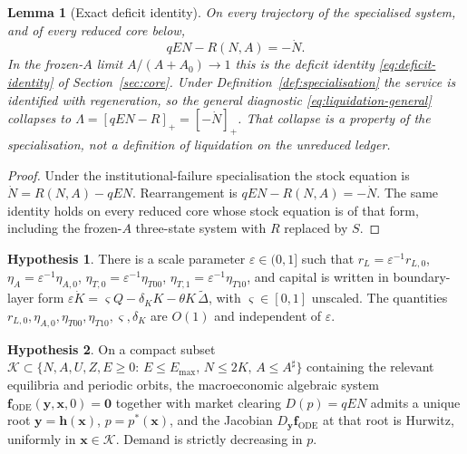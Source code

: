 \documentclass[11pt]{article}
\newtheorem{lemma}{Lemma}
\theoremstyle{definition}
\newtheorem{hypothesis}{Hypothesis}
\begin{document}
\begin{lemma}[Exact deficit identity]
\label{lem:deficit-identity}
On every trajectory of the specialised system, and of every reduced core below,
\begin{equation}
qEN-R(N,A)=-\dot N.
\label{eq:identity-full}
\end{equation}
In the frozen-$A$ limit $A/(A+A_0)\to 1$ this is the deficit identity \eqref{eq:deficit-identity} of Section~\ref{sec:core}. Under Definition~\ref{def:specialisation} the service is identified with regeneration, so the general diagnostic \eqref{eq:liquidation-general} collapses to $\Lambda=[qEN-R]_+=[-\dot N]_+$. That collapse is a property of the specialisation, not a definition of liquidation on the unreduced ledger.
\end{lemma}

\begin{proof}
Under the institutional-failure specialisation the stock equation is $\dot N=R(N,A)-qEN$. Rearrangement is $qEN-R(N,A)=-\dot N$. The same identity holds on every reduced core whose stock equation is of that form, including the frozen-$A$ three-state system with $R$ replaced by $S$.
\end{proof}

\begin{hypothesis}
\label{hyp:scale}
There is a scale parameter $\varepsilon\in(0,1]$ such that $r_L=\varepsilon^{-1}r_{L,0}$, $\eta_A=\varepsilon^{-1}\eta_{A,0}$, $\eta_{T,0}=\varepsilon^{-1}\eta_{T00}$, $\eta_{T,1}=\varepsilon^{-1}\eta_{T10}$, and capital is written in boundary-layer form $\varepsilon\dot K=\varsigma Q-\delta_K K-\theta K\,\widetilde\Delta$, with $\varsigma\in[0,1]$ unscaled. The quantities $r_{L,0},\eta_{A,0},\eta_{T00},\eta_{T10},\varsigma,\delta_K$ are $O(1)$ and independent of $\varepsilon$.
\end{hypothesis}

\begin{hypothesis}
\label{hyp:hurwitz}
On a compact subset $\mathcal K\subset\{N,A,U,Z,E\ge 0:\,E\le E_{\max},\,N\le 2K,\,A\le A^\sharp\}$ containing the relevant equilibria and periodic orbits, the macroeconomic algebraic system $\mathbf f_{\mathrm{ODE}}(\mathbf y,\mathbf x,0)=\mathbf 0$ together with market clearing $D(p)=qEN$ admits a unique root $\mathbf y=\mathbf h(\mathbf x)$, $p=p^*(\mathbf x)$, and the Jacobian $D_{\mathbf y}\mathbf f_{\mathrm{ODE}}$ at that root is Hurwitz, uniformly in $\mathbf x\in\mathcal K$. Demand is strictly decreasing in $p$.
\end{hypothesis}
\end{document}
